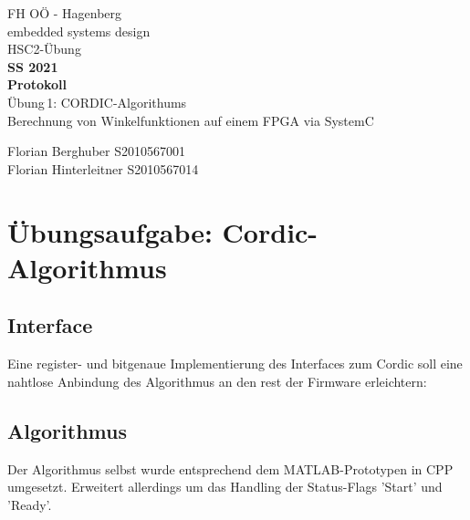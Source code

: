 \documentclass{article}
\newcommand{\bild}[3]{
\begin{center}			\texttt{[image: \#1]}			
		\end{center}	
}
\begin{document}
\begin{titlepage}
	\begin{center}
		{\large{FH OÖ - Hagenberg \\ embedded systems design}\\\vspace*{4cm}}
		\small{HSC2-Übung}\\
		\textbf{SS 2021}\\\vspace*{2cm}
		\Huge{\textbf{Protokoll}}\\\vspace*{1cm}
		\huge{Übung\,1: CORDIC-Algorithums\\ \large{Berechnung von Winkelfunktionen auf einem FPGA via SystemC} } \vspace*{90mm}
		
		\small{Florian Berghuber S2010567001 \\
		Florian Hinterleitner S2010567014	\\
		}
	\end{center}
\end{titlepage}

 
\section{Übungsaufgabe: Cordic-Algorithmus}

\subsection{Interface}
Eine register- und bitgenaue Implementierung des Interfaces zum Cordic soll eine nahtlose Anbindung des Algorithmus an den rest der Firmware erleichtern: \\
\subsection{Algorithmus}
Der Algorithmus selbst wurde entsprechend dem MATLAB-Prototypen in CPP umgesetzt.
Erweitert allerdings um das Handling der Status-Flags 'Start' und 'Ready'.

\end{document}
